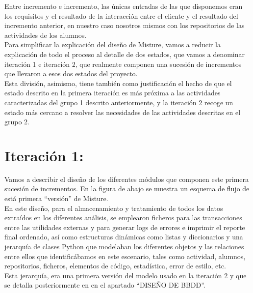 Entre incremento e incremento, las únicas entradas de las que disponemos eran los requisitos y el resultado de la interacción entre el cliente y el resultado del incremento anterior, en nuestro caso nosotros mismos con los repositorios de las actividades de los alumnos.\\


Para simplificar la explicación del diseño de Misture, vamos a reducir la explicación de todo el proceso al detalle de dos estados, que vamos a denominar iteración 1 e iteración 2, que realmente componen una sucesión de incrementos que llevaron a esos dos estados del proyecto.\\


Esta división, asimismo, tiene también como justificación el hecho de que el estado descrito en la primera iteración es más próxima a las actividades caracterizadas del grupo 1 descrito anteriormente, y la iteración 2 recoge un estado más cercano a resolver las necesidades de las actividades descritas en el grupo 2.\\

\section{Iteración 1:}

Vamos a describir el diseño de los diferentes módulos que componen este primera sucesión de incrementos. En la figura de abajo se muestra un esquema de flujo de está primera ``versión'' de Misture.\\


En este diseño, para el almacenamiento y tratamiento de todos los datos extraídos en los diferentes análisis, se emplearon ficheros para las transacciones entre las utilidades externas y para generar logs de errores e imprimir el reporte final ordenado, así como estructuras dinámicas como listas y diccionarios y una jerarquía de clases Python que modelaban los diferentes objetos y las relaciones entre ellos que identificábamos en este escenario, tales como actividad, alumnos, repositorios, ficheros, elementos de código, estadística, error de estilo, etc.\\


Esta jerarquía, era una primera versión del modelo usado en la iteración 2 y que se detalla posteriormente en en el apartado ``DISEÑO DE BBDD''.\\

